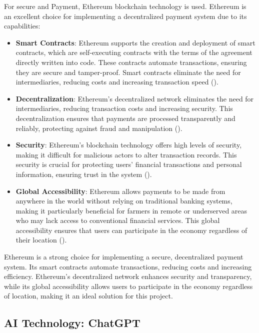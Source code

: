 For secure and Payment, Ethereum blockchain technology is used. Ethereum is an excellent choice for implementing a decentralized payment system due to its capabilities:

\begin{itemize}
    \item \textbf{Smart Contracts}: Ethereum supports the creation and deployment of smart contracts, which are self-executing contracts with the terms of the agreement directly written into code. These contracts automate transactions, ensuring they are secure and tamper-proof. Smart contracts eliminate the need for intermediaries, reducing costs and increasing transaction speed (\cite{ethereum_smart_contracts}).
    \item \textbf{Decentralization}: Ethereum's decentralized network eliminates the need for intermediaries, reducing transaction costs and increasing security. This decentralization ensures that payments are processed transparently and reliably, protecting against fraud and manipulation (\cite{ethereum_decentralization}).
    \item \textbf{Security}: Ethereum's blockchain technology offers high levels of security, making it difficult for malicious actors to alter transaction records. This security is crucial for protecting users' financial transactions and personal information, ensuring trust in the system (\cite{ethereum_security}).
    \item \textbf{Global Accessibility}: Ethereum allows payments to be made from anywhere in the world without relying on traditional banking systems, making it particularly beneficial for farmers in remote or underserved areas who may lack access to conventional financial services. This global accessibility ensures that users can participate in the economy regardless of their location (\cite{ethereum_accessibility}).
\end{itemize}
Ethereum is a strong choice for implementing a secure, decentralized payment system. Its smart contracts automate transactions, reducing costs and increasing efficiency. Ethereum's decentralized network enhances security and transparency, while its global accessibility allows users to participate in the economy regardless of location, making it an ideal solution for this project.

\subsection{AI Technology: ChatGPT}

